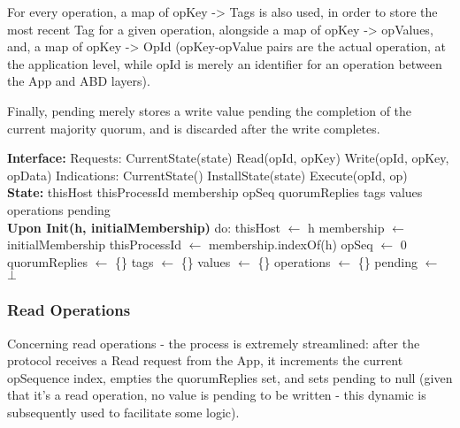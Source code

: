 \documentclass[sigconf]{acmart}
\begin{document}
For every operation, a map of opKey -> Tags is also used, in order to store the most recent Tag for a given operation, alongside a map of opKey -> opValues, and, a map of opKey -> OpId (opKey-opValue pairs are the actual operation, at the application level, while opId is merely an identifier for an operation between the App and ABD layers).

Finally, pending merely stores a write value pending the completion of the current majority quorum, and is discarded after the write completes. \\

\begin{algorithmic}[1]
\small
\State \textbf{Interface:}
\State \quad Requests:
\State \quad \quad CurrentState(state)
\State \quad \quad Read(opId, opKey)
\State \quad \quad Write(opId, opKey, opData)
\State \quad Indications:
\State \quad \quad CurrentState()
\State \quad \quad InstallState(state)
\State \quad \quad Execute(opId, op)\\

\State \textbf{State:}
\State \quad thisHost 
\State \quad thisProcessId 
\State \quad membership 
\State \quad opSeq 
\State \quad quorumReplies 
\State \quad tags 
\State \quad values 
\State \quad operations 
\State \quad pending  \\

\State \textbf{Upon Init(h, initialMembership)} do:
\State \quad thisHost $\gets$ h
\State \quad membership $\gets$ initialMembership
\State \quad thisProcessId $\gets$ membership.indexOf(h)
\State \quad opSeq $\gets$ 0
\State \quad quorumReplies $\gets$ \{\}
\State \quad tags $\gets$ \{\}
\State \quad values $\gets$ \{\}
\State \quad operations $\gets$ \{\}
\State \quad pending $\gets$ $\bot$

\end{algorithmic}

\subsubsection{Read Operations}

Concerning read operations - the process is extremely streamlined: after the protocol receives a Read request from the App, it increments the current opSequence index, empties the quorumReplies set, and sets pending to null (given that it's a read operation, no value is pending to be written - this dynamic is subsequently used to facilitate some logic). 
\end{document}
